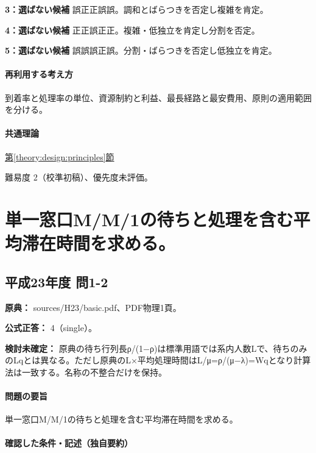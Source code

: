 \noindent\textbf{3：選ばない候補} 誤正正誤誤。調和とばらつきを否定し複雑を肯定。\par

\noindent\textbf{4：選ばない候補} 正正誤正正。複雑・低独立を肯定し分割を否定。\par

\noindent\textbf{5：選ばない候補} 誤誤誤正誤。分割・ばらつきを否定し低独立を肯定。\par

\paragraph{再利用する考え方} 到着率と処理率の単位、資源制約と利益、最長経路と最安費用、原則の適用範囲を分ける。

\paragraph{共通理論} \hyperref[theory:design:principles]{第\ref*{theory:design:principles}節}

\par 難易度 2（校準初稿）、優先度未評価。

\section{単一窓口M/M/1の待ちと処理を含む平均滞在時間を求める。}

\subsection{平成23年度 問1-2}
\label{q:h23-reg-basic-1-2}

\noindent\textbf{原典：} sources/H23/basic.pdf、PDF物理1頁。

\textbf{公式正答：} 4（single）。

\par\textbf{検討未確定：} 原典の待ち行列長ρ/(1−ρ)は標準用語では系内人数Lで、待ちのみのLqとは異なる。ただし原典のL×平均処理時間はL/μ=ρ/(μ−λ)=\allowbreak{}Wqとなり計算法は一致する。名称の不整合だけを保持。

\paragraph{問題の要旨} 単一窓口M/M/1の待ちと処理を含む平均滞在時間を求める。

\paragraph{確認した条件・記述（独自要約）}\mbox{}\par

